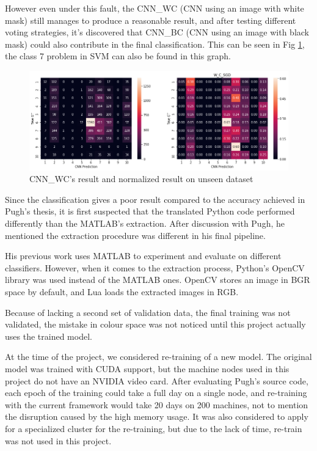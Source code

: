 \documentclass[bsc,frontabs,twoside,fullspacing,parskip,deptreport]{infthesis}
\begin{document}
However even under this fault, the CNN\_WC (CNN using an image with white mask) still manages to produce a reasonable result, and after testing different voting strategies, it's discovered that CNN\_BC (CNN using an image with black mask) could also contribute in the final classification.
This can be seen in Fig \ref{fig:cnnbcacc}, the class 7 problem in SVM can also be found in this graph.

\begin{figure}[h]
\centering
    \includegraphics[scale=0.44]{graph/cnnwc.png}
    \caption{CNN\_WC's result and normalized result on unseen dataset}
    \label{fig:cnnbcacc}
\end{figure} 

Since the classification gives a poor result compared to the accuracy achieved in Pugh's thesis\cite{Pugh}, it is first suspected that the translated Python code performed differently than the MATLAB's extraction.
After discussion with Pugh, he mentioned the extraction procedure was different in his final pipeline.

His previous work uses MATLAB to experiment and evaluate on different classifiers.
However, when it comes to the extraction process, Python's OpenCV library was used instead of the MATLAB ones.
OpenCV stores an image in BGR space by default, and Lua loads the extracted images in RGB.

Because of lacking a second set of validation data, the final training was not validated, the mistake in colour space was not noticed until this project actually uses the trained model.

At the time of the project, we considered re-training of a new model. 
The original model was trained with CUDA support, but the machine nodes used in this project do not have an NVIDIA video card. 
After evaluating Pugh's source code, each epoch of the training could take a full day on a single node, and re-training with the current framework would take 20 days on 200 machines, not to mention the disruption caused by the high memory usage. 
It was also considered to apply for a specialized cluster for the re-training, but due to the lack of time, re-train was not used in this project.
\end{document}
